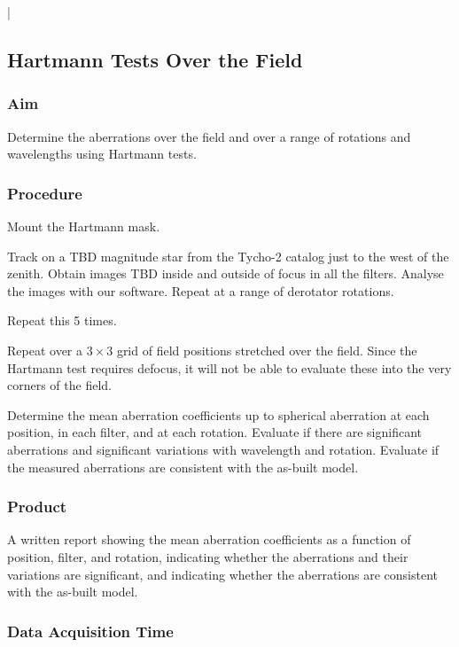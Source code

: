 |\documentclass{article}
\begin{document}

\subsection{Hartmann Tests Over the Field}

\subsubsection{Aim}

Determine the aberrations over the field and over a range of rotations and wavelengths using Hartmann tests.

\subsubsection{Procedure}

Mount the Hartmann mask.

Track on a TBD magnitude star from the Tycho-2 catalog just to the west of the zenith. Obtain images TBD inside and outside of focus in all the filters. Analyse the images with our software. Repeat at a range of derotator rotations.

Repeat this 5 times.

Repeat over a $3\times3$ grid of field positions stretched over the field. Since the Hartmann test requires defocus, it will not be able to evaluate these into the very corners of the field.

Determine the mean aberration coefficients up to spherical aberration at each position, in each filter, and at each rotation. Evaluate if there are significant aberrations and significant variations with wavelength and rotation. Evaluate if the measured aberrations are consistent with the as-built model.

\subsubsection{Product}

A written report showing the mean aberration coefficients as a function of position, filter, and rotation, indicating whether the aberrations and their variations are significant, and indicating whether the aberrations are consistent with the as-built model. 

\subsubsection{Data Acquisition Time}
\end{document}
